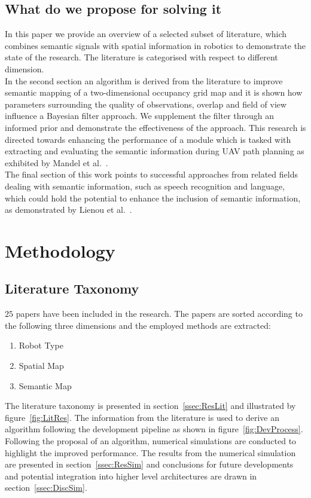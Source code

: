 \documentclass[twocolumn,letterpaper]{IEEEAerospaceCLS}  %
\begin{document}
\subsection{What do we propose for solving it}
In this paper we provide an overview of a selected subset of literature, which combines semantic signals with spatial information in robotics to demonstrate the state of the research. The literature is categorised with respect to different dimension.\\
In the second section an algorithm is derived from the literature to improve semantic mapping of a two-dimensional occupancy grid map and it is shown how parameters surrounding the quality of observations, overlap and field of view influence a Bayesian filter approach. We supplement the filter through an informed prior and demonstrate the effectiveness of the approach. This research is directed towards enhancing the performance of a module which is tasked with extracting and evaluating the semantic information during UAV path planning as exhibited by Mandel et al.~\cite{mandel_towards_2020}.\\
The final section of this work points to successful approaches from related fields dealing with semantic information, such as speech recognition and language, which could hold the potential to enhance the inclusion of semantic information, as demonstrated by Lienou et al.~\cite{lienou_semantic_2010}.
\section{Methodology} \label{sec:Met}
\subsection{Literature Taxonomy} \label{ssec:MetLit}
$25$ papers have been included in the research. The papers are sorted according to the following three dimensions and the employed methods are extracted:
\begin{enumerate}
    \item Robot Type
    \item Spatial Map
    \item Semantic Map
\end{enumerate}
The literature taxonomy is presented in section~\ref{ssec:ResLit} and illustrated by figure~\ref{fig:LitRes}. The information from the literature is used to derive an algorithm following the development pipeline as shown in figure~\ref{fig:DevProcess}. Following the proposal of an algorithm, numerical simulations are conducted to highlight the improved performance. The results from the numerical simulation are presented in section~\ref{ssec:ResSim} and conclusions for future developments and potential integration into higher level architectures are drawn in section~\ref{ssec:DiscSim}.
\end{document}
